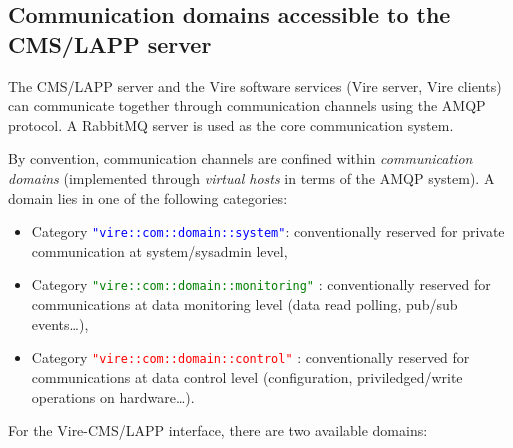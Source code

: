 \subsection{Communication domains accessible to the CMS/LAPP server}

The CMS/LAPP server and the  Vire software services (Vire server, Vire
clients) can communicate together through communication channels using
the  AMQP   protocol.   A  RabbitMQ   server  is  used  as   the  core
communication system.

By   convention,   communication    channels   are   confined   within
\emph{communication domains} (implemented through \emph{virtual hosts}
in terms of the  AMQP system).  A domain lies in  one of the following
categories:

\begin{itemize}

\item
  Category    \textcolor{blue}{\texttt{"vire::com::domain::system"}}:
  conventionally reserved for private communication at system/sysadmin
  level,

\item
  Category \textcolor{green}{\texttt{"vire::com::domain::monitoring"}}
  :  conventionally reserved  for  communications  at data  monitoring
  level (data read polling, pub/sub events\dots),

\item
  Category   \textcolor{red}{\texttt{"vire::com::domain::control"}}  :
  conventionally  reserved for  communications at  data control  level
  (configuration, priviledged/write operations on hardware\dots).

\end{itemize}

For the Vire-CMS/LAPP interface, there are two available domains:

